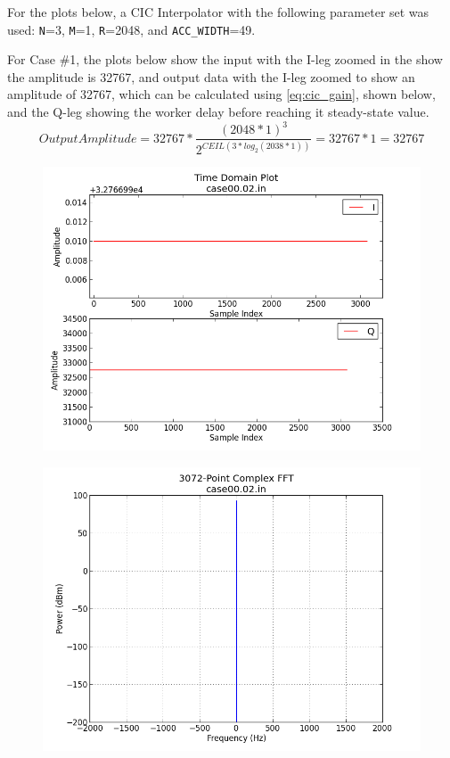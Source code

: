 \documentclass{article}
\begin{document}
For the plots below, a CIC Interpolator with the following parameter set was used: \verb+N+=3, \verb+M+=1, \verb+R+=2048, and \verb+ACC_WIDTH+=49.\bigskip

\newpage
	For Case \#1, the plots below show the input with the I-leg zoomed in the show the amplitude is 32767, and output data with the I-leg zoomed to show an amplitude of 32767, which can be calculated using \ref{eq:cic_gain}, shown below, and the Q-leg showing the worker delay before reaching it steady-state value.
		  \begin{equation} \label{eq:cic_gain_applied}
	      	Output Amplitude = 32767*\frac{(2048*1)^3}{2^{CEIL(3*log_2(2038*1))}} = 32767*1=32767
	      \end{equation}

	\begin{figure}[ht]
		\centering
		\begin{minipage}{.5\textwidth}
			\centering\includegraphics[width=1.0\linewidth]{input_time_DC}
			\label{fig:input_time_DC}
		\end{minipage}%
		\begin{minipage}{.5\textwidth}
			\centering\includegraphics[width=1.0\linewidth]{input_freq_DC}
			\label{fig:input_freq_DC}
		\end{minipage}
	\end{figure}
\end{document}

